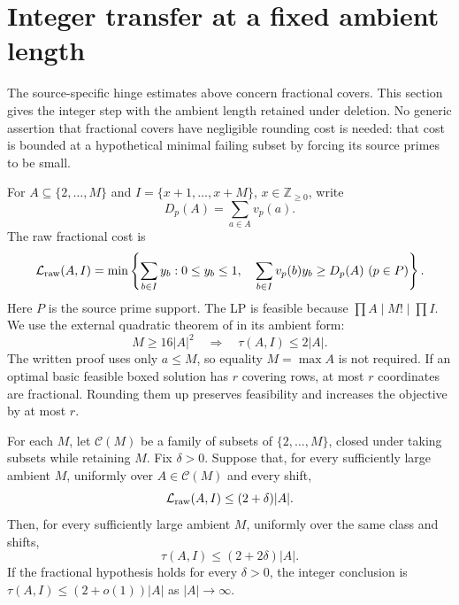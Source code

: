 \section{Integer transfer at a fixed ambient length}
\label{sec:tr-transfer}

The source-specific hinge estimates above concern fractional covers. This
section gives the integer step with the ambient length retained under
deletion. No generic assertion that fractional covers have negligible
rounding cost is needed: that cost is bounded at a hypothetical minimal
failing subset by forcing its source primes to be small.

For $A\subseteq\{2,\ldots,M\}$ and
$I=\{x+1,\ldots,x+M\}$, $x\in\mathbb Z_{\ge0}$, write
\[
 D_p(A)=\sum_{a\in A}v_p(a).
\]
The raw fractional cost is
\[
 \mathcal L_{\rm raw}(A,I)=
 \min\left\{\sum_{b\in I}y_b:
 0\le y_b\le1,\quad
 \sum_{b\in I}v_p(b)y_b\ge D_p(A)\ (p\in P)
 \right\}.
\]
Here $P$ is the source prime support. The LP is feasible because
$\prod A\mid M!\mid\prod I$. We use the
external quadratic theorem of \cite{Wang} in its ambient form:
\begin{equation}
 M\ge16|A|^2\quad\Longrightarrow\quad\tau(A,I)\le2|A|.
 \label{eq:tr-quadratic}
\end{equation}
The written proof uses only $a\le M$, so equality $M=\max A$ is not
required. If an optimal basic feasible boxed solution has $r$ covering
rows, at most $r$ coordinates are fractional. Rounding them up preserves
feasibility and increases the objective by at most $r$.

\begin{lemma}
\label{lem:tr-hereditary}
For each $M$, let $\mathcal C(M)$ be a family of subsets of
$\{2,\ldots,M\}$, closed under taking subsets while retaining $M$.
Fix $\delta>0$. Suppose that, for every sufficiently large ambient $M$,
uniformly over $A\in\mathcal C(M)$ and every shift,
\[
 \mathcal L_{\rm raw}(A,I)\le(2+\delta)|A|.
\]
Then, for every sufficiently large ambient $M$, uniformly over the same
class and shifts,
\[
 \tau(A,I)\le(2+2\delta)|A|.
\]
If the fractional hypothesis holds for every $\delta>0$, the integer
conclusion is $\tau(A,I)\le(2+o(1))|A|$ as $|A|\to\infty$.
\end{lemma}

